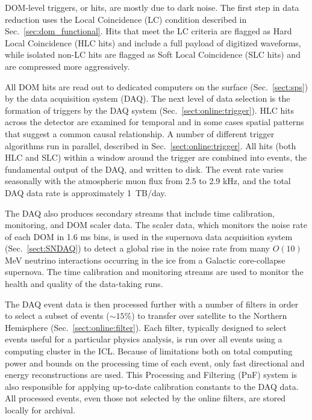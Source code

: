 DOM-level triggers, or hits, are mostly due to dark noise. The first step
in data reduction uses the Local Coincidence (LC) condition described in
Sec.~\ref{sec:dom_functional}.  Hits that meet the LC criteria are flagged
as Hard Local Coincidence (HLC hits) and include a full payload of
digitized waveforms, while isolated non-LC hits are flagged as Soft Local
Coincidence (SLC hits) and are compressed more aggressively.

All DOM hits are read out to dedicated computers on the surface
(Sec.~\ref{sect:sps}) by the data acquisition system (DAQ).  The next level
of data selection is the formation of triggers by the DAQ system
(Sec.~\ref{sect:online:trigger}). HLC hits across the detector are examined
for temporal and in some cases spatial patterns that suggest a common
causal relationship.  A number of different trigger algorithms run in
parallel, described in Sec.~\ref{sect:online:trigger}.  All hits (both HLC
and SLC) within a window around the trigger are combined into events, the
fundamental output of the DAQ, and written to disk.  The event rate varies
seasonally with the atmospheric muon flux from 2.5 to 2.9 kHz,
and the total DAQ data rate is approximately 1~TB/day.

The DAQ also produces secondary streams that include time calibration,
monitoring, and DOM scaler data.  The scaler data, which monitors the
noise rate of each DOM in 1.6 ms bins, is used in the supernova data
acquisition system (Sec.~\ref{sect:SNDAQ}) to detect a global rise in the
noise rate from many $O(10)$ MeV neutrino interactions occurring in the ice
from a Galactic core-collapse supernova.  The time calibration and
monitoring streams are used to monitor the health and quality of the
data-taking runs.

The DAQ event data is then processed further with a number of filters
in order to select a subset of events ($\sim15$\%) to transfer over
satellite to the Northern Hemisphere (Sec.~\ref{sect:online:filter}).  Each
filter, typically designed to select events useful for a particular physics
analysis, is run over all events using a computing cluster in the ICL.
Because of limitations both on total computing power and bounds on the
processing time of each event, only fast directional and energy
reconstructions are used.  This Processing and Filtering (PnF) system is
also responsible for applying up-to-date calibration constants to the DAQ
data. All processed events, even those not selected by the online filters,
are stored locally for archival.

